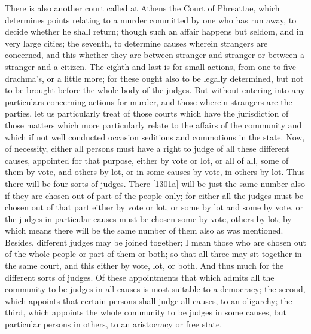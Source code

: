 There is also another court called at Athens the Court of Phreattae, which
determines points relating to a murder committed by one who has run away,
to decide whether he shall return; though such an affair happens but
seldom, and in very large cities; the seventh, to determine causes wherein
strangers are concerned, and this whether they are between stranger and
stranger or between a stranger and a citizen. The eighth and last is for
small actions, from one to five drachma's, or a little more; for these
ought also to be legally determined, but not to be brought before the
whole body of the judges. But without entering into any particulars
concerning actions for murder, and those wherein strangers are the
parties, let us particularly treat of those courts which have the
jurisdiction of those matters which more particularly relate to the
affairs of the community and which if not well conducted occasion
seditions and commotions in the state. Now, of necessity, either all
persons must have a right to judge of all these different causes,
appointed for that purpose, either by vote or lot, or all of all, some of
them by vote, and others by lot, or in some causes by vote, in others by
lot. Thus there will be four sorts of judges. There [1301a] will be just
the same number also if they are chosen out of part of the people only;
for either all the judges must be chosen out of that part either by vote
or lot, or some by lot and some by vote, or the judges in particular
causes must be chosen some by vote, others by lot; by which means there
will be the same number of them also as was mentioned. Besides, different
judges may be joined together; I mean those who are chosen out of the
whole people or part of them or both; so that all three may sit together
in the same court, and this either by vote, lot, or both. And thus much
for the different sorts of judges. Of these appointments that which admits
all the community to be judges in all causes is most suitable to a
democracy; the second, which appoints that certain persons shall judge all
causes, to an oligarchy; the third, which appoints the whole community to
be judges in some causes, but particular persons in others, to an
aristocracy or free state.



